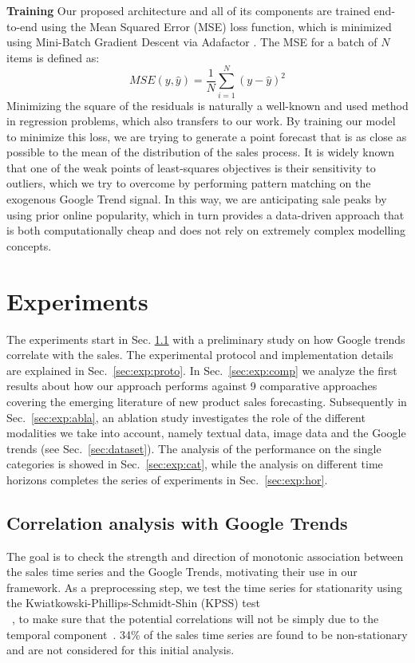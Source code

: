 \documentclass{article}
\begin{document}
\textbf{Training}
Our proposed architecture and all of its components are trained end-to-end using the Mean Squared Error (MSE) loss function, which is minimized using Mini-Batch Gradient Descent via Adafactor \cite{shazeer2018adafactor}. The MSE for a batch of $N$ items is defined as:
\begin{equation}
    MSE(y, \hat{y}) = \frac{1}{N} \sum_{i=1}^N (y-\hat{y})^2
\end{equation}
Minimizing the square of the residuals is naturally a well-known and used method in regression problems, which also transfers to our work. By training our model to minimize this loss, we are trying to generate a point forecast that is as close as possible to the mean of the distribution of the sales process. It is widely known that one of the weak points of least-squares objectives is their sensitivity to outliers, which we try to overcome by performing pattern matching on the exogenous Google Trend signal. In this way, we are anticipating sale peaks by using prior online popularity, which in turn provides a data-driven approach that is both computationally cheap and does not rely on extremely complex modelling concepts. 
\section{Experiments}\label{sec:exp}
The experiments start in Sec. \ref{sec:exp:corr} with a preliminary study on how Google trends correlate with the sales. The experimental protocol and implementation details are explained in Sec.~\ref{sec:exp:proto}. In Sec.~\ref{sec:exp:comp} we analyze the first results about how our approach performs against 9 comparative approaches covering the emerging literature of new product sales forecasting. Subsequently in Sec.~\ref{sec:exp:abla}, an ablation study investigates the role of the different modalities we take into account, namely  textual data, image data and the Google trends (see Sec.~\ref{sec:dataset}). The analysis of the performance on the single categories is showed in Sec.~\ref{sec:exp:cat}, while the analysis on different time horizons completes the series of experiments in Sec.~\ref{sec:exp:hor}.    

\subsection{Correlation analysis with Google Trends}\label{sec:exp:corr}
The goal is to check the strength and direction of monotonic association between the sales time series and the Google Trends, motivating their use in our framework. As a preprocessing step, we test the time series for stationarity using the Kwiatkowski-Phillips-Schmidt-Shin (KPSS) test\\~\cite{KPSS}, to make sure that the potential correlations will not be simply due to the temporal component~\cite{aldrich1995correlations}. 34\% of the sales time series are found to be non-stationary and are not considered for this initial analysis.
\end{document}
